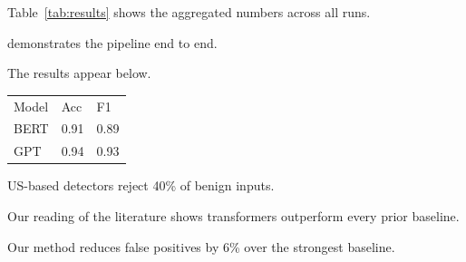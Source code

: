\documentclass{article}
\begin{document}
Table~\ref{tab:results} shows the aggregated numbers across all runs.

 demonstrates the pipeline end to end.

The results appear below.
\begin{tabular}{lll}
Model & Acc & F1 \\
BERT  & 0.91 & 0.89 \\
GPT   & 0.94 & 0.93 \\
\end{tabular}

US-based detectors reject 40\% of benign inputs.

Our reading of the literature shows transformers outperform every prior baseline.

Our method reduces false positives by 6\% over the strongest baseline.
\end{document}
